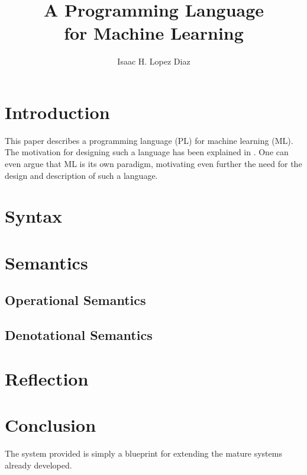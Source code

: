 \documentclass{article}
\title{A Programming Language \\ for Machine Learning}
\author{Isaac H. Lopez Diaz}
\begin{document}
\maketitle
\section{Introduction}
This paper describes a programming language (PL) for machine learning (ML).
The motivation for designing such a language has been explained in \cite{mlpl}.
One can even argue that ML is its own paradigm,
motivating even further the need for the design and description of such a language. \\

\section{Syntax}

\section{Semantics}

\subsection{Operational Semantics}

\subsection{Denotational Semantics}

\section{Reflection}

\section{Conclusion}
The system provided is simply a blueprint for extending the mature systems already developed. 

\nocite*{}


\end{document}
